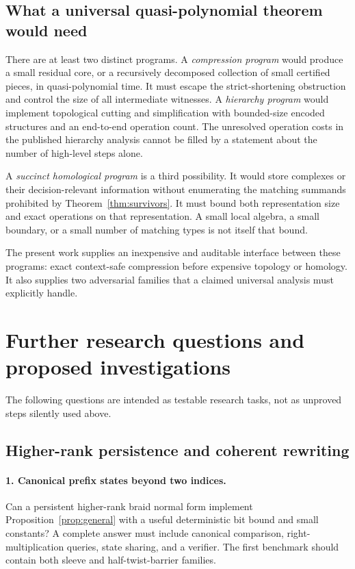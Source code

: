 \documentclass[11pt]{article}
\theoremstyle{definition}
\theoremstyle{remark}
\begin{document}
\subsection{What a universal quasi-polynomial theorem would need}
There are at least two distinct programs. A \emph{compression program}
would produce a small residual core, or a recursively decomposed collection
of small certified pieces, in quasi-polynomial time. It must escape the
strict-shortening obstruction and control the size of all intermediate
witnesses. A \emph{hierarchy program} would implement topological cutting and
simplification with bounded-size encoded structures and an end-to-end
operation count. The unresolved operation costs in the published hierarchy
analysis cannot be filled by a statement about the number of high-level
steps alone.

A \emph{succinct homological program} is a third possibility. It would store
complexes or their decision-relevant information without enumerating the
matching summands prohibited by Theorem~\ref{thm:survivors}. It must bound
both representation size and exact operations on that representation.
A small local algebra, a small boundary, or a small number of matching types
is not itself that bound.

The present work supplies an inexpensive and auditable interface between
these programs: exact context-safe compression before expensive topology or
homology. It also supplies two adversarial families that a claimed universal
analysis must explicitly handle.

\section{Further research questions and proposed investigations}
The following questions are intended as testable research tasks, not as
unproved steps silently used above.

\subsection{Higher-rank persistence and coherent rewriting}
\paragraph{1. Canonical prefix states beyond two indices.}
Can a persistent higher-rank braid normal form implement
Proposition~\ref{prop:general} with a useful deterministic bit bound and
small constants? A complete answer must include canonical comparison,
right-multiplication queries, state sharing, and a verifier. The first
benchmark should contain both sleeve and half-twist-barrier families.
\end{document}
